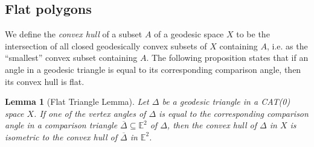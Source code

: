 \documentclass[11pt, a4paper, oneside]{memoir}
\theoremstyle{plain}\newtheorem{theorem}[subsection]{Theorem}
\newtheorem{lemma}[subsection]{Lemma}
\theoremstyle{definition}
\newcommand{\E}{\mathbb{E}}
\begin{document}
\subsection{Flat polygons}
We define the \textit{convex hull} of a subset \(A\) of a geodesic space \(X\) to be the intersection of all closed geodesically convex subsets of \(X\) containing \(A\), i.e. as the ``smallest'' convex subset containing \(A\).
The following proposition states that if an angle in a geodesic triangle is equal to its corresponding comparison angle, then its convex hull is flat.
\begin{lemma}[Flat Triangle Lemma]\label{lem:flat_tri}
Let \(\Delta\) be a geodesic triangle in a CAT(0) space \(X\).
If one of the vertex angles of \(\Delta\) is equal to the corresponding comparison angle in a comparison triangle \(\overline{\Delta}\subseteq\E^2\) of \(\Delta\), then the convex hull of \(\Delta\) in \(X\) is isometric to the convex hull of \(\overline{\Delta}\) in \(\E^2\).
\end{lemma}
\end{document}
